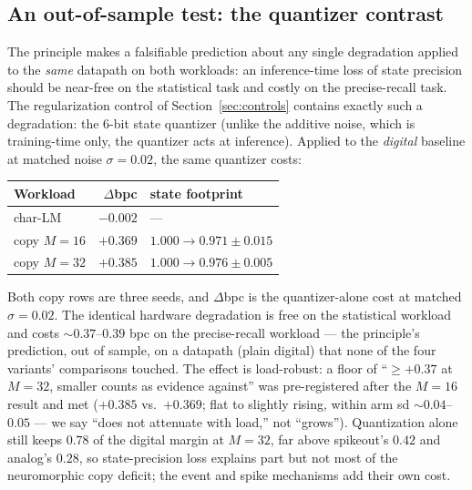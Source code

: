 \subsection{An out-of-sample test: the quantizer contrast}
\label{sec:principle-quantizer}

The principle makes a falsifiable prediction about any single degradation applied to the
\emph{same} datapath on both workloads: an inference-time loss of state precision should be
near-free on the statistical task and costly on the precise-recall task. The regularization
control of Section~\ref{sec:controls} contains exactly such a degradation: the 6-bit state
quantizer (unlike the additive noise, which is training-time only, the quantizer acts at
inference). Applied to the \emph{digital} baseline at matched noise $\sigma{=}0.02$, the same
quantizer costs:

\begin{center}
\footnotesize
\setlength{\tabcolsep}{4pt}
\begin{tabular}{l r l}
\toprule
Workload & $\Delta$bpc & state footprint \\
\midrule
char-LM         & $-0.002$ & --- \\
copy $M{=}16$   & $+0.369$ & $1.000{\to}0.971{\pm}0.015$ \\
copy $M{=}32$   & $+0.385$ & $1.000{\to}0.976{\pm}0.005$ \\
\bottomrule
\end{tabular}
\end{center}

\noindent
Both copy rows are three seeds, and $\Delta$bpc is the quantizer-alone cost at matched
$\sigma{=}0.02$. The identical hardware degradation is free on the statistical workload and costs
$\sim 0.37$--$0.39$ bpc on the precise-recall workload --- the principle's prediction, out of
sample, on a datapath (plain digital) that none of the four variants' comparisons touched.
The effect is load-robust: a floor of ``$\ge +0.37$ at $M{=}32$, smaller counts as evidence
against'' was pre-registered after the $M{=}16$ result and met ($+0.385$ vs.\ $+0.369$; flat
to slightly rising, within arm sd $\sim 0.04$--$0.05$ --- we say ``does not attenuate with
load,'' not ``grows''). Quantization alone still keeps $0.78$ of the digital margin at
$M{=}32$, far above spikeout's $0.42$ and analog's $0.28$, so state-precision loss explains
part but not most of the neuromorphic copy deficit; the event and spike mechanisms add their
own cost.

